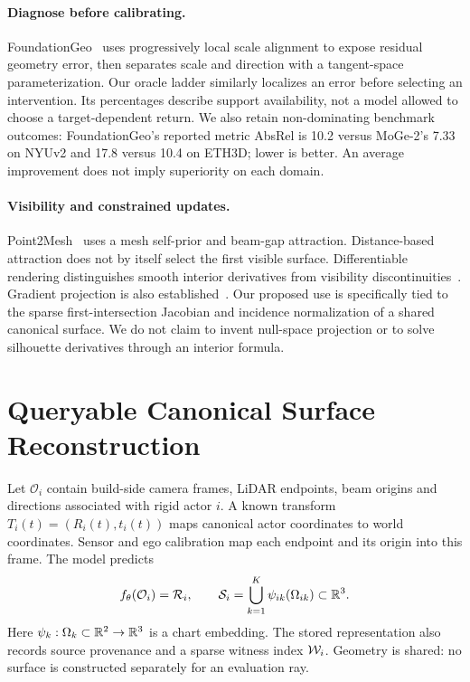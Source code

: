 \paragraph{Diagnose before calibrating.}
FoundationGeo~\cite{foundationgeo} uses progressively local scale alignment to expose residual geometry error, then separates scale and direction with a tangent-space parameterization. Our oracle ladder similarly localizes an error before selecting an intervention. Its percentages describe support availability, not a model allowed to choose a target-dependent return. We also retain non-dominating benchmark outcomes: FoundationGeo's reported metric AbsRel is 10.2 versus MoGe-2's 7.33 on NYUv2 and 17.8 versus 10.4 on ETH3D; lower is better. An average improvement does not imply superiority on each domain.

\paragraph{Visibility and constrained updates.}
Point2Mesh~\cite{point2mesh} uses a mesh self-prior and beam-gap attraction. Distance-based attraction does not by itself select the first visible surface. Differentiable rendering distinguishes smooth interior derivatives from visibility discontinuities~\cite{nvdiffrast,projective}. Gradient projection is also established~\cite{pcgrad,rosen}. Our proposed use is specifically tied to the sparse first-intersection Jacobian and incidence normalization of a shared canonical surface. We do not claim to invent null-space projection or to solve silhouette derivatives through an interior formula.

\section{Queryable Canonical Surface Reconstruction}
\label{sec:task}
Let $\mathcal O_i$ contain build-side camera frames, LiDAR endpoints, beam origins and directions associated with rigid actor $i$. A known transform $T_i(t)=(R_i(t),t_i(t))$ maps canonical actor coordinates to world coordinates. Sensor and ego calibration map each endpoint and its origin into this frame. The model predicts
\begin{equation}
 f_\theta(\mathcal O_i)=\mathcal R_i,
 \qquad \mathcal S_i=\bigcup_{k=1}^{K}\psi_{ik}(\Omega_{ik})\subset\mathbb R^3.
 \label{eq:surface}
\end{equation}
Here $\psi_k:\Omega_k\subset\mathbb R^2\to\mathbb R^3$ is a chart embedding. The stored representation also records source provenance and a sparse witness index $\mathcal W_i$. Geometry is shared: no surface is constructed separately for an evaluation ray.

